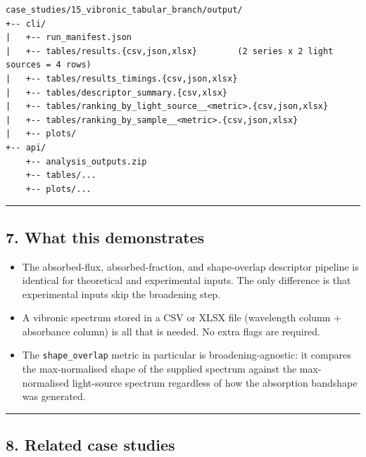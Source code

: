 \documentclass[
  11pt,
]{article}
\providecommand{\tightlist}{
  \setlength{\itemsep}{0pt}\setlength{\parskip}{0pt}}
\begin{document}
\begin{verbatim}
case_studies/15_vibronic_tabular_branch/output/
+-- cli/
|   +-- run_manifest.json
|   +-- tables/results.{csv,json,xlsx}        (2 series x 2 light sources = 4 rows)
|   +-- tables/results_timings.{csv,json,xlsx}
|   +-- tables/descriptor_summary.{csv,xlsx}
|   +-- tables/ranking_by_light_source__<metric>.{csv,json,xlsx}
|   +-- tables/ranking_by_sample__<metric>.{csv,json,xlsx}
|   +-- plots/
+-- api/
    +-- analysis_outputs.zip
    +-- tables/...
    +-- plots/...
\end{verbatim}

\begin{center}\rule{0.5\linewidth}{0.5pt}\end{center}

\hypertarget{7-what-this-demonstrates}{
\subsection{7. What this demonstrates}\label{7-what-this-demonstrates}}

\begin{itemize}
\tightlist
\item
  The absorbed-flux, absorbed-fraction, and shape-overlap descriptor
  pipeline is identical for theoretical and experimental inputs. The
  only difference is that experimental inputs skip the broadening step.
\item
  A vibronic spectrum stored in a CSV or XLSX file (wavelength column
  + absorbance column) is all that is needed. No extra flags are
  required.
\item
  The \texttt{shape\_overlap} metric in particular is
  broadening-agnostic: it compares the max-normalised shape of the
  supplied spectrum against the max-normalised light-source spectrum
  regardless of how the absorption bandshape was generated.
\end{itemize}

\begin{center}\rule{0.5\linewidth}{0.5pt}\end{center}

\hypertarget{8-related-case-studies}{
\subsection{8. Related case studies}\label{8-related-case-studies}}
\end{document}
